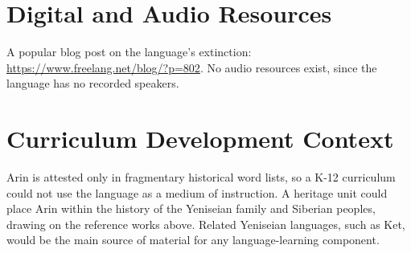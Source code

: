 \documentclass[12pt]{article}
\begin{document}
\section{Digital and Audio Resources}
A popular blog post on the language's extinction: \url{https://www.freelang.net/blog/?p=802}. No audio resources exist, since the language has no recorded speakers.

\section{Curriculum Development Context}
Arin is attested only in fragmentary historical word lists, so a K-12 curriculum could not use the language as a medium of instruction. A heritage unit could place Arin within the history of the Yeniseian family and Siberian peoples, drawing on the reference works above. Related Yeniseian languages, such as Ket, would be the main source of material for any language-learning component.
\end{document}
